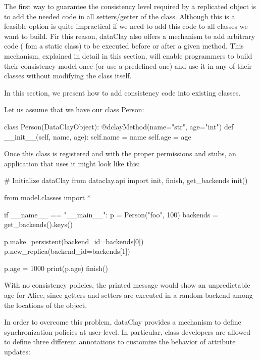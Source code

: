 The first way to guarantee the consistency level required by a replicated object is to add the needed code in all setters/getter of the class. Although this is a feasible option is quite impractical if we need to add this code to all classes we want to build. Fir this reason, dataClay also offers a mechanism to add arbitrary code ( fom a static class) to be executed before or after a given method. This mechanism, explained in detail in this section, will enable programmers to build their consistency model once (or use a predefined one) and use it in any of their classes without modifying the class itself.

In this section, we present how to add consistency code into existing classes.

Let us assume that we have our class Person:

\begin{tBox}
\begin{python}
class Person(DataClayObject):
    @dclayMethod(name="str", age="int")
    def __init__(self, name, age):
        self.name = name
        self.age = age
\end{python}
\end{tBox}

Once this class is registered and with the proper permissions and stubs, an application that uses it might look like this:

\begin{tBox}
\begin{python}
# Initialize dataClay
from dataclay.api import init, finish, get_backends
init()

from model.classes import *

if __name__ == "__main__":
    p = Person("foo", 100)
    backends = get_backends().keys()
    
    p.make_persistent(backend_id=backends[0])
    p.new_replica(backend_id=backends[1])    
    
    p.age = 1000
    print(p.age)    
    finish()
\end{python}
\end{tBox}

With no consistency policies, the printed message would show an unpredictable age for Alice, since getters and setters are executed in a random backend among the locations of the object.

In order to overcome this problem, dataClay provides a mechanism to define synchronization policies at user-level. In particular, class developers are allowed to define three different annotations to customize the behavior of attribute updates:

